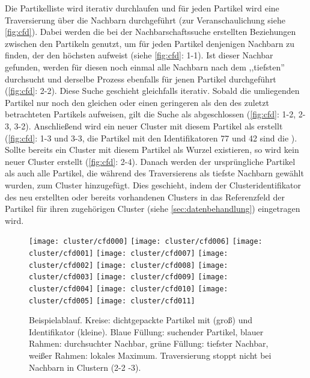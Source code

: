Die Partikelliste wird iterativ durchlaufen und für jeden Partikel wird eine Traversierung über die Nachbarn durchgeführt (zur Veranschaulichung siehe \autoref{fig:cfd}). Dabei werden die bei der Nachbarschaftssuche erstellten Beziehungen zwischen den Partikeln genutzt, um für jeden Partikel denjenigen Nachbarn zu finden, der den höchsten  aufweist (siehe \autoref{fig:cfd}: 1-1). Ist dieser Nachbar gefunden, werden für diesen noch einmal alle Nachbarn nach dem ,,tiefsten'' durchsucht und derselbe Prozess ebenfalls für jenen Partikel durchgeführt (\autoref{fig:cfd}: 2-2). Diese Suche geschieht gleichfalls iterativ. Sobald die umliegenden Partikel nur noch den gleichen oder einen geringeren  als den des zuletzt betrachteten Partikels aufweisen, gilt die Suche als abgeschlossen (\autoref{fig:cfd}: 1-2, 2-3, 3-2). Anschließend wird ein neuer Cluster mit diesem Partikel als  erstellt (\autoref{fig:cfd}: 1-3 und 3-3, die Partikel mit den Identifikatoren 77 und 42 sind die ). Sollte bereits ein Cluster mit diesem Partikel als Wurzel existieren, so wird kein neuer Cluster erstellt (\autoref{fig:cfd}: 2-4). Danach werden der ursprüngliche Partikel als auch alle Partikel, die während des Traversierens als tiefste Nachbarn gewählt wurden, zum Cluster hinzugefügt. Dies geschieht, indem der Clusteridentifikator des neu erstellten oder bereits vorhandenen Clusters in das Referenzfeld der Partikel für ihren zugehörigen Cluster (siehe \autoref{sec:datenbehandlung}) eingetragen wird.

\begin{figure}
	\texttt{[image: cluster/cfd000]}
	\hspace*{\columnsep}%
	\texttt{[image: cluster/cfd006]}
	\vss
	\texttt{[image: cluster/cfd001]}
	\hspace*{\columnsep}%
	\texttt{[image: cluster/cfd007]}
	\vss
	\texttt{[image: cluster/cfd002]}
	\hspace*{\columnsep}%
	\texttt{[image: cluster/cfd008]}
	\vss
	\texttt{[image: cluster/cfd003]}
	\hspace*{\columnsep}%
	\texttt{[image: cluster/cfd009]}
	\vss
	\texttt{[image: cluster/cfd004]}
	\hspace*{\columnsep}%
	\texttt{[image: cluster/cfd010]}
	\vss
	\texttt{[image: cluster/cfd005]}
	\hspace*{\columnsep}%
	\texttt{[image: cluster/cfd011]}
	\caption{\CFD Beispielablauf. Kreise: dichtgepackte Partikel mit  (groß) und Identifikator (kleine). Blaue Füllung: suchender Partikel, blauer Rahmen: durchsuchter Nachbar, grüne Füllung: tiefster Nachbar, weißer Rahmen: lokales Maximum. Traversierung stoppt nicht bei Nachbarn in Clustern (2-2 -3).}\label{fig:cfd}
\end{figure}

